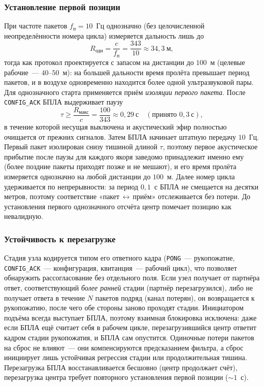 \subsubsection{Установление первой позиции}

При частоте пакетов $f_\text{п}{=}10$~Гц однозначно (без целочисленной
неопределённости номера цикла) измеряется дальность лишь до
\[
R_\text{одн}=\frac{c}{f_\text{п}}=\frac{343}{10}\approx 34{,}3~\text{м},
\]
тогда как протокол проектируется с запасом на дистанции до $100$~м (целевые рабочие~---
$40$--$50$~м): на большей дальности время пролёта превышает период пакетов, и в воздухе
одновременно находится более одной ультразвуковой пары. Для однозначного старта применяется приём \emph{изоляции
первого пакета}. После \texttt{CONFIG\_ACK} БПЛА выдерживает паузу
\[
\tau \ge \frac{R_\text{макс}}{c}=\frac{100}{343}\approx 0{,}29~\text{с}\quad
(\text{принято }0{,}3~\text{с}),
\]
в течение которой несущая выключена и акустический эфир полностью очищается от
прежних сигналов. Затем БПЛА начинает штатную передачу $10$~Гц. Первый пакет
изолирован снизу тишиной длиной $\tau$, поэтому первое акустическое прибытие после
паузы для каждого якоря заведомо принадлежит именно ему (более поздние пакеты
приходят позже и не мешают), и его время пролёта измеряется однозначно на любой
дистанции до $100$~м. Далее номер цикла удерживается по непрерывности: за период
$0{,}1$~с БПЛА не смещается на десятки метров, поэтому соответствие
«пакет\,$\leftrightarrow$\,приём» отслеживается без потери. До установления первого
однозначного отсчёта центр помечает позицию как невалидную.

\subsubsection{Устойчивость к перезагрузке}

Стадия узла кодируется типом его ответного кадра (\texttt{PONG}~--- рукопожатие,
\texttt{CONFIG\_ACK}~--- конфигурация, квитанция~--- рабочий цикл), что позволяет
обнаружить рассогласование без отдельного поля. Если узел получает от партнёра
ответ, соответствующий \emph{более ранней} стадии (партнёр перезагрузился), либо
не получает ответа в течение $N$ пакетов подряд (канал потерян), он возвращается к
рукопожатию, после чего обе стороны заново проходят стадии. Инициатором подъёма
всегда выступает БПЛА, поэтому взаимная блокировка исключена: даже если БПЛА ещё
считает себя в рабочем цикле, перезагрузившийся центр ответит кадром стадии
рукопожатия, и БПЛА сам опустится. Одиночные потери пакетов на сброс не влияют~---
они компенсируются предсказанием фильтра, а сброс инициирует лишь устойчивая
регрессия стадии или продолжительная тишина. Перезагрузка БПЛА восстанавливается
бесшовно (центр продолжает счёт), перезагрузка центра требует повторного
установления первой позиции (${\sim}1$~с).

